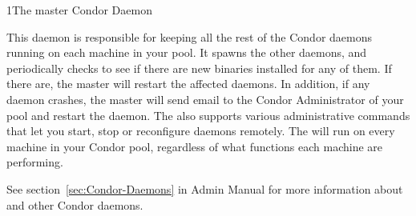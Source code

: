 \begin{ManPage}{}{1}{The master Condor Daemon}
\label{man-condor-master}
\Synopsis {}

\Description 

This daemon is responsible for keeping all the
rest of the Condor daemons running on each machine in your pool.  It  
spawns the other daemons, and periodically checks to see if there are
new binaries installed for any of them.  If there are, the master will
restart the affected daemons.  In addition, if any daemon crashes, the
master will send email to the Condor Administrator of your pool and 
restart the daemon.  The  also supports various
administrative commands that let you start, stop or reconfigure
daemons remotely.  The  will run on every machine in 
your Condor pool, regardless of what functions each machine are
performing.

See section~\ref{sec:Condor-Daemons} in Admin Manual for more information
about  and other Condor daemons.

\end{ManPage}
